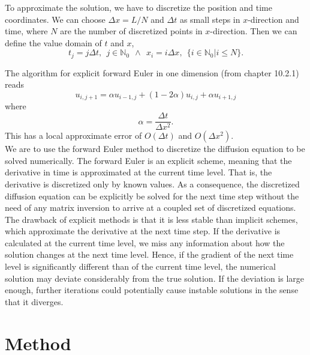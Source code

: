 \documentclass[12pt]{extarticle}
\begin{document}
To approximate the solution, we have to discretize the position and time coordinates. We can choose  $\Delta x = L/N$ and $\Delta t$ as small steps in $x$-direction and time, where $N$ are the number of discretized points in $x$-direction. Then we can define the value domain of $t$ and $x$,
\begin{equation*}
t_j = j\Delta t, \ \ j\in \mathbb{N}_0 \ \ \wedge \ \ x_i = i\Delta x, \ \ \{i \in \mathbb{N}_0 | i \leq N\}.
\end{equation*}

The algorithm for explicit forward Euler in one dimension (from \cite{lectures2015} chapter 10.2.1) reads
\begin{equation}
\label{eq:forward_euler}
u_{i, j+1} = \alpha u_{i-1, j} + (1 - 2\alpha) u_{i,j} + \alpha u_{i+1, j}
\end{equation}
where
\begin{equation*}
\alpha = \frac{\Delta t}{\Delta x^2}.
\end{equation*}
This has a local approximate error of $O(\Delta t)$ and $O(\Delta x ^2)$. \\

We are to use the forward Euler method to discretize the diffusion equation to be solved numerically. The forward Euler is an explicit scheme, meaning that the derivative in time is approximated at the current time level.
That is, the derivative is discretized only by known values. As a consequence, the discretized diffusion equation can be explicitly be solved for the next time step without the need of any matrix inversion to arrive at a coupled
set of discretized equations. The drawback of explicit methods is that it is less stable than implicit schemes, which approximate the derivative at the next time step.
If the derivative is calculated at the current time level, we miss any information about how the solution changes at the next time level. 
Hence, if the gradient of the next time level is significantly different than of the current time level, the numerical solution may deviate considerably from the true solution. 
If the deviation is large enough, further iterations could potentially cause instable solutions in the sense that it diverges.

\section{Method}
\end{document}
